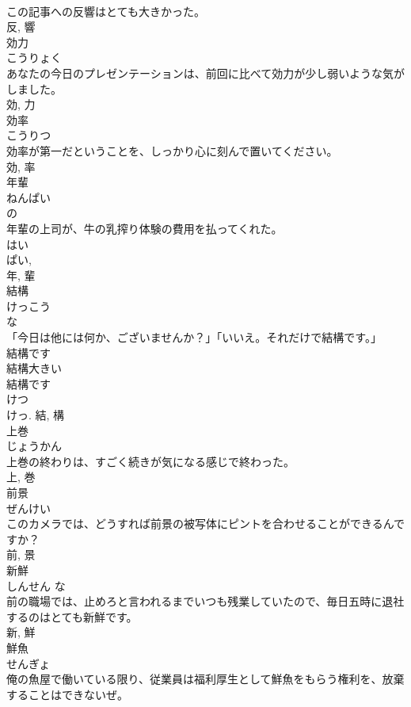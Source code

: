 \documentclass[8pt]{extreport}
\begin{document}
\begin{CJK}{UTF8}{min}
\\	この記事への反響はとても大きかった。	
\\	反, 響	
\\	効力	
\\	こうりょく	
\\	あなたの今日のプレゼンテーションは、前回に比べて効力が少し弱いような気がしました。	
\\	効, 力	
\\	効率	
\\	こうりつ	
\\	効率が第一だということを、しっかり心に刻んで置いてください。	
\\	効, 率	
\\	年輩	
\\	ねんぱい	
\\	の 
\\	年輩の上司が、牛の乳搾り体験の費用を払ってくれた。	
\\	はい 
\\	ぱい, 
\\	年, 輩	
\\	結構	
\\	けっこう	
\\	な 
\\	「今日は他には何か、ございませんか？」「いいえ。それだけで結構です。」	
\\	結構です 
\\	結構大きい 
\\	結構です 
\\	けつ 
\\	けっ.	結, 構	
\\	上巻	
\\	じょうかん	
\\	上巻の終わりは、すごく続きが気になる感じで終わった。	
\\	上, 巻	
\\	前景	
\\	ぜんけい	
\\	このカメラでは、どうすれば前景の被写体にピントを合わせることができるんですか？	
\\	前, 景	
\\	新鮮	
\\	しんせん	な 
\\	前の職場では、止めろと言われるまでいつも残業していたので、毎日五時に退社するのはとても新鮮です。	
\\	新, 鮮	
\\	鮮魚	
\\	せんぎょ	
\\	俺の魚屋で働いている限り、従業員は福利厚生として鮮魚をもらう権利を、放棄することはできないぜ。	

\end{CJK}
\end{document}
